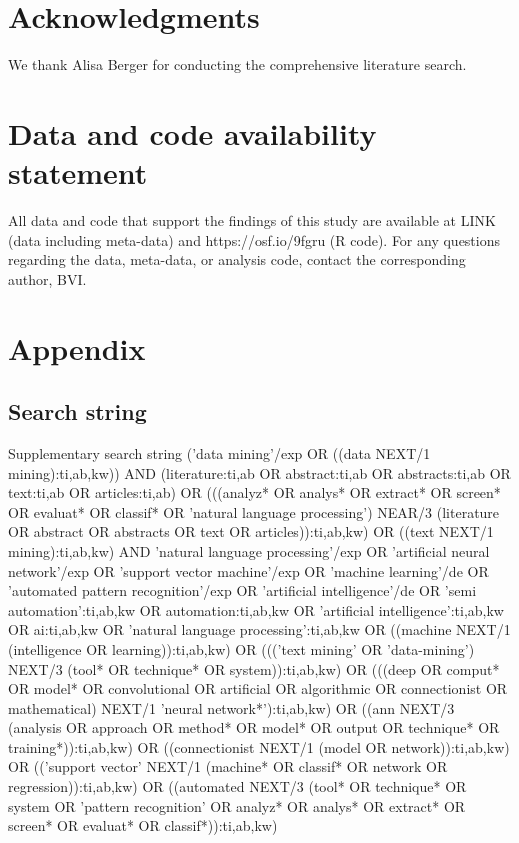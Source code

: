 \documentclass[fleqn,10pt]{olplainarticle}
\begin{document}
\section*{Acknowledgments}
We thank Alisa Berger for conducting the comprehensive literature search.

\section*{Data and code availability statement}
All data and code that support the findings of this study are available at LINK (data including meta-data) and https://osf.io/9fgru  (R code). For any questions regarding the data, meta-data, or analysis code, contact the corresponding author, BVI.




\section*{Appendix}

\subsection*{Search string}

Supplementary search string
('data mining'/exp OR ((data NEXT/1 mining):ti,ab,kw)) AND (literature:ti,ab OR abstract:ti,ab OR abstracts:ti,ab OR text:ti,ab OR articles:ti,ab) OR (((analyz* OR analys* OR extract* OR screen* OR evaluat* OR classif* OR 'natural language processing') NEAR/3 (literature OR abstract OR abstracts OR text OR articles)):ti,ab,kw) OR ((text NEXT/1 mining):ti,ab,kw)
AND
'natural language processing'/exp OR 'artificial neural network'/exp OR 'support vector machine'/exp OR 'machine learning'/de OR 'automated pattern recognition'/exp OR 'artificial intelligence'/de OR 'semi automation':ti,ab,kw OR automation:ti,ab,kw OR 'artificial intelligence':ti,ab,kw OR ai:ti,ab,kw OR 'natural language processing':ti,ab,kw OR ((machine NEXT/1 (intelligence OR learning)):ti,ab,kw) OR ((('text mining' OR 'data-mining') NEXT/3 (tool* OR technique* OR system)):ti,ab,kw) OR (((deep OR comput* OR model* OR convolutional OR artificial OR algorithmic OR connectionist OR mathematical) NEXT/1 'neural network*'):ti,ab,kw) OR ((ann NEXT/3 (analysis OR approach OR method* OR model* OR output OR technique* OR training*)):ti,ab,kw) OR ((connectionist NEXT/1 (model OR network)):ti,ab,kw) OR (('support vector' NEXT/1 (machine* OR classif* OR network OR regression)):ti,ab,kw) OR ((automated NEXT/3 (tool* OR technique* OR system OR 'pattern recognition' OR analyz* OR analys* OR extract* OR screen* OR evaluat* OR classif*)):ti,ab,kw)
\end{document}
